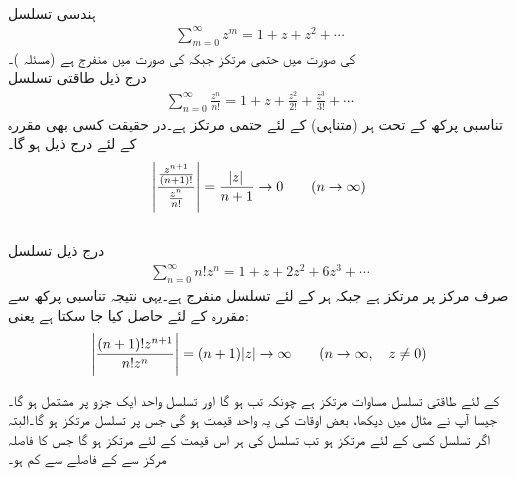 \quad {}\\
ہندسی تسلسل
\begin{align*}
\sum\limits_{m=0}^{\infty} z^m=1+z+z^2+\cdots
\end{align*}
 کی صورت میں حتمی مرتکز جبکہ  کی صورت میں منفرج  ہے (مسئلہ )۔
\quad {}\\
درج ذیل طاقتی تسلسل
\begin{align*}
\sum\limits_{n=0}^{\infty} \frac{z^n}{n!}=1+z+\frac{z^2}{2!}+\frac{z^3}{3!}+\cdots
\end{align*}
تناسبی پرکھ کے تحت ہر (متناہی)  کے لئے حتمی مرتکز ہے۔در حقیقت کسی بھی مقررہ  کے لئے درج ذیل ہو گا۔
\begin{align*}
\abs{\frac{\tfrac{z^{n+1}}{(n+1)!}}{\tfrac{z^n}{n!}}}=\frac{\abs{z}}{n+1}\to 0 \quad \quad (n\to \infty)
\end{align*}
\quad {}\\
درج ذیل تسلسل
\begin{align*}
\sum\limits_{n=0}^{\infty} n! z^n=1+z+2z^2+6z^3+\cdots
\end{align*}
صرف مرکز  پر مرتکز ہے جبکہ ہر  کے لئے  تسلسل منفرج ہے۔یہی نتیجہ تناسبی پرکھ سے مقررہ  کے لئے حاصل کیا جا سکتا ہے یعنی:
\begin{align*}
\abs{\frac{(n+1)!z^{n+1}}{n!z^n}}=(n+1)\abs{z}\to \infty \quad \quad (n\to \infty,\quad z\ne 0)
\end{align*}

 کے لئے طاقتی تسلسل مساوات   مرتکز ہے چونکہ تب  ہو گا اور تسلسل واحد ایک جزو  پر مشتمل ہو گا۔ جیسا آپ نے مثال  میں دیکھا، بعض اوقات  کی یہ واحد قیمت ہو گی جس پر تسلسل مرتکز ہو گا۔البتہ اگر تسلسل  کسی  کے لئے مرتکز ہو تب تسلسل  کی ہر اس قیمت کے لئے مرتکز ہو گا  جس کا فاصلہ مرکز سے   کے فاصلے سے کم ہو۔

